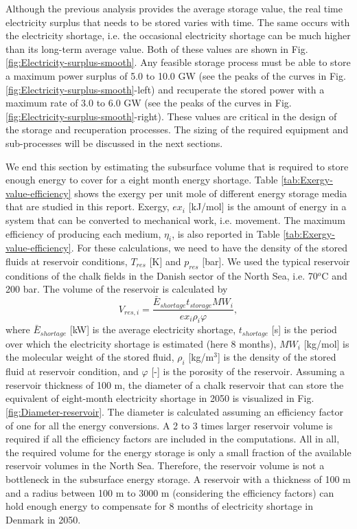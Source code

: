 \documentclass{ECOS_2021}
\begin{document}
Although the previous analysis provides the average storage value,
the real time electricity surplus that needs to be stored varies with
time. The same occurs with the electricity shortage, i.e. the occasional
electricity shortage can be much higher than its long-term average
value. Both of these values are shown in Fig. \ref{fig:Electricity-surplus-smooth}.
Any feasible storage process must be able to store a maximum power
surplus of 5.0 to 10.0 GW (see the peaks of the curves in Fig. \ref{fig:Electricity-surplus-smooth}-left)
and recuperate the stored power with a maximum rate of 3.0 to 6.0
GW (see the peaks of the curves in Fig. \ref{fig:Electricity-surplus-smooth}-right).
These values are critical in the design of the storage and recuperation
processes. The sizing of the required equipment and sub-processes
will be discussed in the next sections. 

We end this section by estimating the subsurface volume that is required
to store enough energy to cover for a eight month energy shortage.
Table \ref{tab:Exergy-value-efficiency} shows the exergy per unit
mole of different energy storage media that are studied in this report.
Exergy, $ex_{i}$ {[}kJ/mol{]} is the amount of energy in a system
that can be converted to mechanical work, i.e. movement. The maximum
efficiency of producing each medium, $\eta_{i}$, is also reported
in Table \ref{tab:Exergy-value-efficiency}. For these calculations,
we need to have the density of the stored fluids at reservoir conditions,
$T_{res}$ {[}K{]} and $p_{res}$ {[}bar{]}. We used the typical reservoir
conditions of the chalk fields in the Danish sector of the North Sea,
i.e. 70$^{o}$C and 200 bar. The volume of the reservoir is calculated
by
\[
V_{res,i}=\frac{\bar{E}_{shortage}t_{storage}MW_{i}}{ex_{i}\rho_{i}\varphi},
\]
where $\bar{E}_{shortage}$ {[}kW{]} is the average electricity shortage,
$t_{shortage}$ {[}s{]} is the period over which the electricity shortage
is estimated (here 8 months), $MW_{i}$ {[}kg/mol{]} is the molecular
weight of the stored fluid, $\rho_{i}$ {[}kg/m$^{3}${]} is the density
of the stored fluid at reservoir condition, and $\varphi$ {[}-{]}
is the porosity of the reservoir. Assuming a reservoir thickness of
100 m, the diameter of a chalk reservoir that can store the equivalent
of eight-month electricity shortage in 2050 is visualized in Fig.
\ref{fig:Diameter-reservoir}. The diameter is calculated assuming
an efficiency factor of one for all the energy conversions. A 2 to
3 times larger reservoir volume is required if all the efficiency
factors are included in the computations. All in all, the required
volume for the energy storage is only a small fraction of the available
reservoir volumes in the North Sea. Therefore, the reservoir volume
is not a bottleneck in the subsurface energy storage. A reservoir
with a thickness of 100 m and a radius between 100 m to 3000 m (considering
the efficiency factors) can hold enough energy to compensate for 8
months of electricity shortage in Denmark in 2050. 
\end{document}
